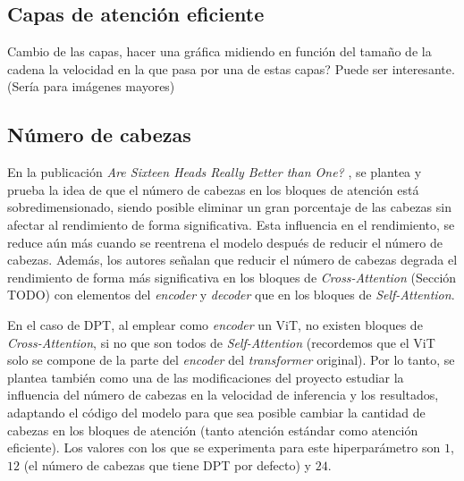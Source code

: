 

\subsection{Capas de atención eficiente}
Cambio de las capas, hacer una gráfica midiendo en función del tamaño de la cadena la velocidad en la que pasa por una de estas capas? Puede ser interesante. (Sería para imágenes mayores)


\subsection{Número de cabezas}
En la publicación \textit{Are Sixteen Heads Really Better than One?} \cite{are16headsbetterthan1}, se plantea y prueba la idea de que el número de cabezas en los bloques de atención está sobredimensionado, siendo posible eliminar un gran porcentaje de las cabezas sin afectar al rendimiento de forma significativa. Esta influencia en el rendimiento, se reduce aún más cuando se reentrena el modelo después de reducir el número de cabezas.  Además, los autores señalan que reducir el número de cabezas degrada el rendimiento de forma más significativa en los bloques de \textit{Cross-Attention} (Sección TODO) con elementos del \textit{encoder} y \textit{decoder} que en los bloques de \textit{Self-Attention}. 

En el caso de DPT, al emplear como \textit{encoder} un ViT, no existen bloques de \textit{Cross-Attention}, si no que son todos de \textit{Self-Attention} (recordemos que el ViT solo se compone de la parte del \textit{encoder} del \textit{transformer} original). Por lo tanto, se plantea también como una de las modificaciones del proyecto estudiar la influencia del número de cabezas en la velocidad de inferencia y los resultados, adaptando el código del modelo para que sea posible cambiar la cantidad de cabezas en los bloques de atención (tanto atención estándar como atención eficiente). Los valores con los que se experimenta para este hiperparámetro son $1$, $12$ (el número de cabezas que tiene DPT por defecto) y $24$.

